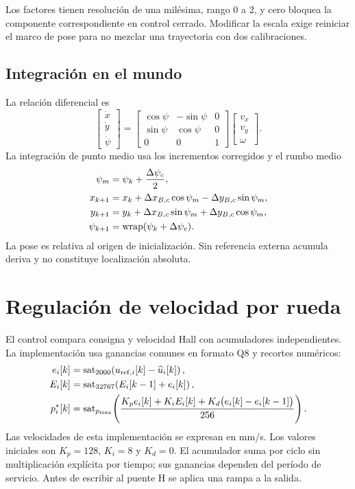 Los factores tienen resolución de una milésima, rango 0 a 2, y cero bloquea la componente correspondiente en control cerrado. Modificar la escala exige reiniciar el marco de pose para no mezclar una trayectoria con dos calibraciones.

\subsection{Integración en el mundo}
La relación diferencial es
\begin{equation}
\begin{bmatrix}\dot x\\\dot y\\\dot\psi\end{bmatrix}=
\begin{bmatrix}\cos\psi&-\sin\psi&0\\\sin\psi&\cos\psi&0\\0&0&1\end{bmatrix}
\begin{bmatrix}v_x\\v_y\\\omega\end{bmatrix}.
\end{equation}
La integración de punto medio usa los incrementos corregidos y el rumbo medio
\begin{align}
\psi_m&=\psi_k+\frac{\Delta\psi_c}{2},\\
x_{k+1}&=x_k+\Delta x_{B,c}\cos\psi_m-\Delta y_{B,c}\sin\psi_m,\\
y_{k+1}&=y_k+\Delta x_{B,c}\sin\psi_m+\Delta y_{B,c}\cos\psi_m,\\
\psi_{k+1}&=\operatorname{wrap}(\psi_k+\Delta\psi_c).
\end{align}
La pose es relativa al origen de inicialización. Sin referencia externa acumula deriva y no constituye localización absoluta.

\section{Regulación de velocidad por rueda}
El control compara consigna y velocidad Hall con acumuladores independientes. La implementación usa ganancias comunes en formato Q8 y recortes numéricos:
\begin{align}
e_i[k]&=\operatorname{sat}_{2000}\!\left(u_{\mathrm{ref},i}[k]-\widehat u_i[k]\right),\\
E_i[k]&=\operatorname{sat}_{32767}\!\left(E_i[k-1]+e_i[k]\right),\\
p_i^*[k]&=\operatorname{sat}_{p_{\max}}\!\left(
\frac{K_pe_i[k]+K_iE_i[k]+K_d\bigl(e_i[k]-e_i[k-1]\bigr)}{256}\right).
\end{align}
Las velocidades de esta implementación se expresan en mm/s. Los valores iniciales son $K_p=128$, $K_i=8$ y $K_d=0$. El acumulador suma por ciclo sin multiplicación explícita por tiempo; sus ganancias dependen del período de servicio. Antes de escribir al puente H se aplica una rampa a la salida.

